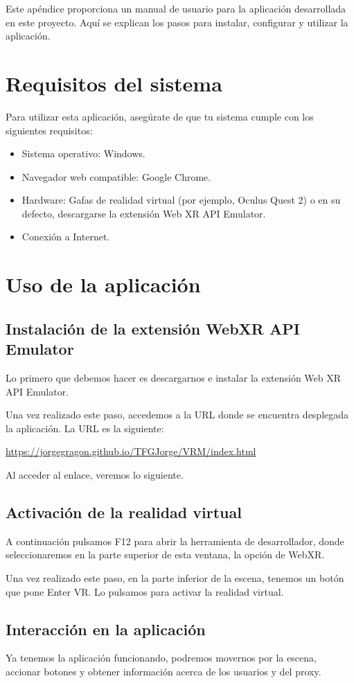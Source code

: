 \documentclass[a4paper, 12pt]{book}
\begin{document}
Este apéndice proporciona un manual de usuario para la aplicación desarrollada en este proyecto. 
Aquí se explican los pasos para instalar, configurar y utilizar la aplicación.

\section{Requisitos del sistema}
Para utilizar esta aplicación, asegúrate de que tu sistema cumple con los siguientes requisitos:
\begin{itemize}
    \item Sistema operativo: Windows.
    \item Navegador web compatible: Google Chrome.
    \item Hardware: Gafas de realidad virtual (por ejemplo, Oculus Quest 2) o en su defecto, descargarse la extensión Web XR API Emulator.
    \item Conexión a Internet.
\end{itemize}

\section{Uso de la aplicación}
\subsection{Instalación de la extensión WebXR API Emulator}
Lo primero que debemos hacer es descargarnos e instalar la extensión 
Web XR API Emulator.

Una vez realizado este paso, accedemos a la URL donde se encuentra 
desplegada la aplicación. La URL es la siguiente:

\url{https://jorgegragon.github.io/TFGJorge/VRM/index.html}

Al acceder al enlace, veremos lo siguiente.

\subsection{Activación de la realidad virtual}
A continuación pulsamos F12 para abrir la herramienta de desarrollador, 
donde seleccionaremos en la parte superior de esta ventana, la opción de WebXR.

Una vez realizado este paso, en la parte inferior de la escena, tenemos 
un botón que pone Enter VR. Lo pulsamos para activar la realidad virtual.

\subsection{Interacción en la aplicación}
Ya tenemos la aplicación funcionando, podremos movernos por la escena, 
accionar botones y obtener información acerca de los usuarios y del proxy.
\end{document}

